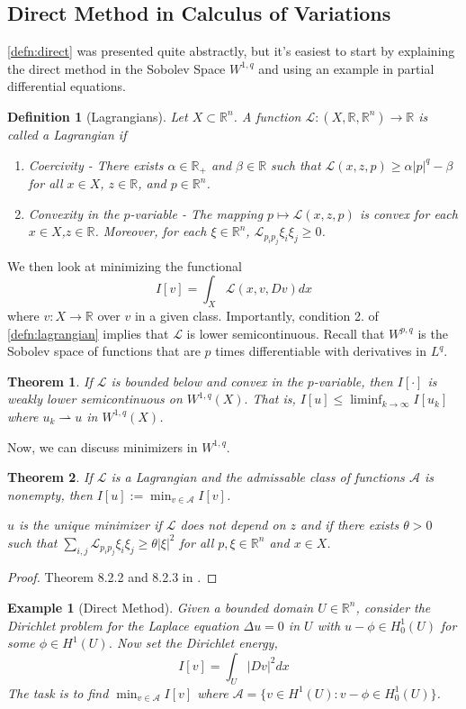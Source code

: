 \documentclass[12pt]{article}
\newcommand{\R}{\mathbb{R}}
\theoremstyle{plain}
\newtheorem{thm}{Theorem}[section]
\newtheorem{defn}{Definition}[section]
\newtheorem{exmp}{Example}[section]
\numberwithin{equation}{section}
\begin{document}
\subsection{Direct Method in Calculus of Variations}
\autoref{defn:direct} was presented quite abstractly, but it's easiest to start by explaining the direct method in the Sobolev Space $W^{1,q}$ and using an example in partial differential equations.
\begin{defn}[Lagrangians]\label{defn:lagrangian}
  Let $X \subset \R^n$. A function $\mathcal{L} : (X, \R,\R^n) \to \R$ is called a Lagrangian if 
  \begin{enumerate}
    \item Coercivity - There exists $\alpha \in \R_+$ and $\beta\in \R$ such that $\mathcal{L}(x,z,p) \ge \alpha|p|^q - \beta$ for all $x\in X$, $z\in \R$, and $p\in\R^n$.
    \item Convexity in the $p$-variable - The mapping $p\mapsto \mathcal{L}(x,z,p)$ is convex for each $x\in X$,$z\in \R$. Moreover, for each $\xi\in\R^n$, $\mathcal{L}_{p_ip_j}\xi_i\xi_j \ge 0$.
  \end{enumerate}
\end{defn}
We then look at minimizing the functional 
\[I[v] = \int_{X}\mathcal{L}(x,v,Dv)dx\]
where $v : X\to\R$ over $v$ in a given class. Importantly, condition 2. of \autoref{defn:lagrangian} implies that $\mathcal{L}$ is lower semicontinuous. Recall that $W^{p,q}$ is the Sobolev space of functions that are $p$ times differentiable with derivatives in $L^q$.
\begin{thm}
  If $\mathcal{L}$ is bounded below and convex in the $p$-variable, then $I[\cdot]$ is weakly lower semicontinuous on $W^{1,q}(X).$ That is, $I[u] \le \liminf_{k\to\infty} I[u_k]$ where $u_k\rightharpoonup u$ in $W^{1,q}(X)$.
\end{thm}
Now, we can discuss minimizers in $W^{1,q}$.
\begin{thm}
  If $\mathcal{L}$ is a Lagrangian and the admissable class of functions $\mathcal{A}$ is nonempty, then $I[u] := \min_{v\in\mathcal{A}} I[v]$.

  $u$ is the unique minimizer if $\mathcal{L}$ does not depend on $z$ and if there exists $\theta > 0$ such that $\sum_{i,j}\mathcal{L}_{p_ip_j}\xi_i\xi_j\ge \theta|\xi|^2$ for all $p,\xi\in\R^n$ and $x\in X$.
\end{thm}
\begin{proof}
  Theorem 8.2.2 and 8.2.3 in \cite{evans}.
\end{proof}
\begin{exmp}[Direct Method]
  Given a bounded domain $U\in \R^n$, consider the Dirichlet problem for the Laplace equation $\Delta u = 0$ in $U$ with $u-\phi \in H_0^1(U)$ for some $\phi \in H^1(U)$. Now set the Dirichlet energy,
  \[I[v] = \int_U |Dv|^2dx\]
  The task is to find $\min_{v\in\mathcal{A}} I[v]$ where $\mathcal{A} = \{v\in H^1(U) : v - \phi \in H^1_0(U)\}$.
\end{exmp}
\end{document}
